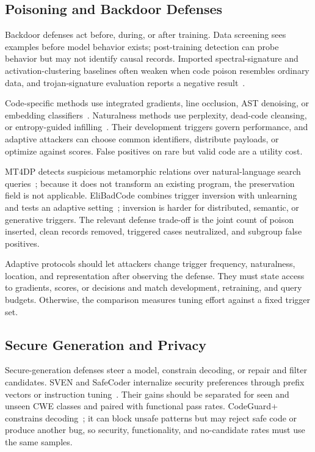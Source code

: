 \documentclass[acmsmall,screen,review]{acmart}
\begin{document}
\subsection{Poisoning and Backdoor Defenses} \label{sec:defense:poison}
Backdoor defenses act before, during, or after training. Data screening sees examples before model behavior exists; post-training detection can probe behavior but may not identify causal records. Imported spectral-signature and activation-clustering baselines often weaken when code poison resembles ordinary data, and trojan-signature evaluation reports a negative result~\cite{ramakrishnan2022backdoors,wan2022yousee,schuster2021autocomplete,hussain2024trojan}.

Code-specific methods use integrated gradients, line occlusion, AST denoising, or embedding classifiers~\cite{li2024codepoisoner,hussain2025oseql,qu2024idba,ghannoum2025codegarrison}. Naturalness methods use perplexity, dead-code cleansing, or entropy-guided infilling~\cite{sun2025killbadcode,depa2025,mu2024codepurify}. Their development triggers govern performance, and adaptive attackers can choose common identifiers, distribute payloads, or optimize against scores. False positives on rare but valid code are a utility cost.

MT4DP detects suspicious metamorphic relations over natural-language search queries~\cite{mt4dp2025}; because it does not transform an existing program, the preservation field is not applicable. EliBadCode combines trigger inversion with unlearning and tests an adaptive setting~\cite{sun2025elibadcode}; inversion is harder for distributed, semantic, or generative triggers. The relevant defense trade-off is the joint count of poison inserted, clean records removed, triggered cases neutralized, and subgroup false positives.

Adaptive protocols should let attackers change trigger frequency, naturalness, location, and representation after observing the defense. They must state access to gradients, scores, or decisions and match development, retraining, and query budgets. Otherwise, the comparison measures tuning effort against a fixed trigger set.

\subsection{Secure Generation and Privacy} \label{sec:defense:gen}
Secure-generation defenses steer a model, constrain decoding, or repair and filter candidates. SVEN and SafeCoder internalize security preferences through prefix vectors or instruction tuning~\cite{he2023sven,he2024safecoder}. Their gains should be separated for seen and unseen CWE classes and paired with functional pass rates. CodeGuard+ constrains decoding~\cite{codeguard2024}; it can block unsafe patterns but may reject safe code or produce another bug, so security, functionality, and no-candidate rates must use the same samples.
\end{document}
